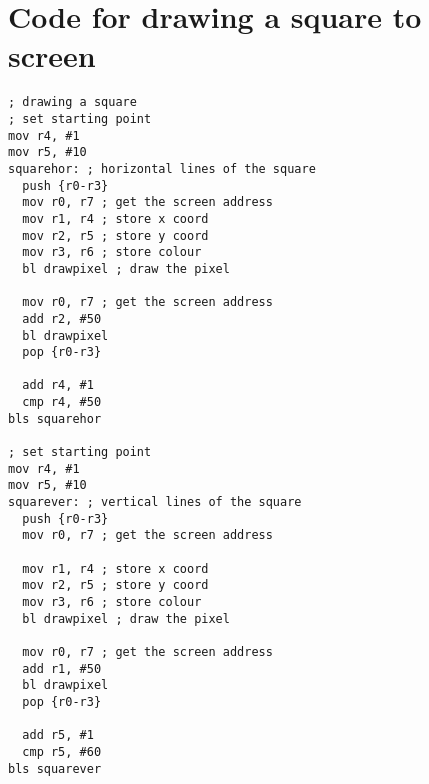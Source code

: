\documentclass[11pt]{scrartcl}
\begin{document}
\section*{Code for drawing a square to screen}
\begin{verbatim}
; drawing a square
; set starting point
mov r4, #1
mov r5, #10
squarehor: ; horizontal lines of the square
  push {r0-r3}
  mov r0, r7 ; get the screen address
  mov r1, r4 ; store x coord
  mov r2, r5 ; store y coord
  mov r3, r6 ; store colour
  bl drawpixel ; draw the pixel
  
  mov r0, r7 ; get the screen address
  add r2, #50
  bl drawpixel
  pop {r0-r3}

  add r4, #1
  cmp r4, #50
bls squarehor

; set starting point
mov r4, #1
mov r5, #10
squarever: ; vertical lines of the square
  push {r0-r3}
  mov r0, r7 ; get the screen address

  mov r1, r4 ; store x coord
  mov r2, r5 ; store y coord
  mov r3, r6 ; store colour
  bl drawpixel ; draw the pixel

  mov r0, r7 ; get the screen address
  add r1, #50
  bl drawpixel
  pop {r0-r3}

  add r5, #1
  cmp r5, #60
bls squarever
\end{verbatim}
\end{document}
